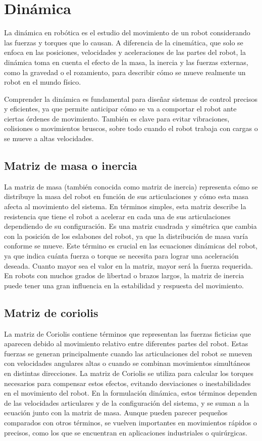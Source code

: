\section{Dinámica} \label{sec:dinamica}

La dinámica en robótica es el estudio del movimiento de un robot considerando las fuerzas y torques que lo causan. A diferencia de la cinemática, que solo se enfoca en las posiciones, velocidades y aceleraciones de las partes del robot, la dinámica toma en cuenta el efecto de la masa, la inercia y las fuerzas externas, como la gravedad o el rozamiento, para describir cómo se mueve realmente un robot en el mundo físico.


Comprender la dinámica es fundamental para diseñar sistemas de control precisos y eficientes, ya que permite anticipar cómo se va a comportar el robot ante ciertas órdenes de movimiento. También es clave para evitar vibraciones, colisiones o movimientos bruscos, sobre todo cuando el robot trabaja con cargas o se mueve a altas velocidades.
\cite{fundamentosRobotica}
\cite{introduccionRobotica}

\subsection{Matriz de masa o inercia}
La matriz de masa (también conocida como matriz de inercia) representa cómo se distribuye la masa del robot en función de sus articulaciones y cómo esta masa afecta al movimiento del sistema. En términos simples, esta matriz describe la resistencia que tiene el robot a acelerar en cada una de sus articulaciones dependiendo de su configuración. Es una matriz cuadrada y simétrica que cambia con la posición de los eslabones del robot, ya que la distribución de masa varía conforme se mueve. Este término es crucial en las ecuaciones dinámicas del robot, ya que indica cuánta fuerza o torque se necesita para lograr una aceleración deseada. Cuanto mayor sea el valor en la matriz, mayor será la fuerza requerida. En robots con muchos grados de libertad o brazos largos, la matriz de inercia puede tener una gran influencia en la estabilidad y respuesta del movimiento.


\subsection{Matriz de coriolis}
La matriz de Coriolis contiene términos que representan las fuerzas ficticias que aparecen debido al movimiento relativo entre diferentes partes del robot. Estas fuerzas se generan principalmente cuando las articulaciones del robot se mueven con velocidades angulares altas o cuando se combinan movimientos simultáneos en distintas direcciones. La matriz de Coriolis se utiliza para calcular los torques necesarios para compensar estos efectos, evitando desviaciones o inestabilidades en el movimiento del robot. En la formulación dinámica, estos términos dependen de las velocidades articulares y de la configuración del sistema, y se suman a la ecuación junto con la matriz de masa. Aunque pueden parecer pequeños comparados con otros términos, se vuelven importantes en movimientos rápidos o precisos, como los que se encuentran en aplicaciones industriales o quirúrgicas.

